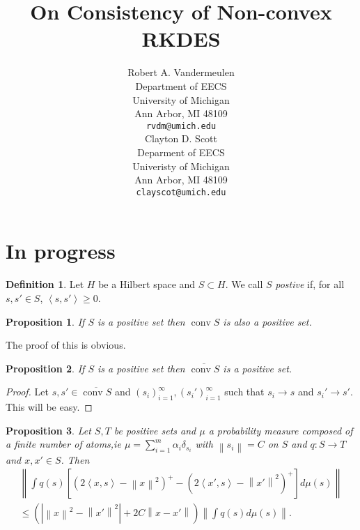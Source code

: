 \documentclass{article} %
\title{On Consistency of Non-convex RKDES}
\author{
	Robert A. Vandermeulen\\
	Department of EECS\\
	University of Michigan\\
	Ann Arbor, MI 48109 \\
	\texttt{rvdm@umich.edu} \\
	\And
	Clayton D. Scott \\
	Deparment of EECS\\
	Univeristy of Michigan\\
	Ann Arbor, MI 48109 \\
	\texttt{clayscot@umich.edu} \\
}
\def\l{\left}
\def\r{\right}
\newtheorem{prop}{Proposition}
\theoremstyle{definition}
\newtheorem{defin}{Definition}
\DeclareMathOperator{\conv}{conv}
\begin{document}
\maketitle
\section{In progress}
\begin{defin}
    Let $H$ be a Hilbert space and $S\subset H$. We call $S$ {\em postive} if, for all $s,s' \in S$, $\l<s,s'\r>\ge 0$.
\end{defin}
\begin{prop}
    If $S$ is a positive set then $\conv S$ is also a positive set. 
\end{prop}
The proof of this is obvious.
\begin{prop}
    If $S$ is a positive set then $\overline{\conv S}$ is a positive set.
\end{prop}
\begin{proof}
    Let $s,s' \in \overline{\conv S}$ and $\left( s_i \right)_{i=1}^\infty, \left( s_i' \right)_{i=1}^\infty$ such that $s_i \to s$ and $s_i' \to s'$. This will be easy.
\end{proof}
\begin{prop}\label{pro:big}
    Let $S,T$ be positive sets and $\mu$ a probability measure composed of a finite number of atoms,ie $\mu= \sum_{i=1}^m \alpha_i \delta_{s_i}$ with $\l\|s_i\r\|= C$ on $S$ and $q:S\to T$ and $x,x' \in S$. Then
    \begin{eqnarray*}
        \l\| \int q(s) \l[\left(2 \l<x,s\r> - \l\|x\r\|^2  \right)^+ - \left( 2\l<x',s\r> - \l\|x'\r\|^2 \right)^+ \r] d\mu(s) \r\|\\
        \le \l( \l| \l\|x\r\|^2 - \l\|x'\r\|^2 \r| + 2C\l\|x - x'\r\|\r) \l\|\int q(s) d\mu(s)\r\|.
    \end{eqnarray*}
\end{prop}
\end{document}
